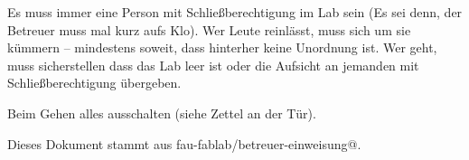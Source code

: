 \documentclass{\basedir/fablab-document}
\begin{document}
Es muss immer eine Person mit Schließberechtigung im Lab sein (Es sei denn, der Betreuer muss mal kurz aufs Klo). Wer Leute reinlässt, muss sich um sie kümmern -- mindestens soweit, dass hinterher keine Unordnung ist. Wer geht, muss sicherstellen dass das Lab leer ist oder die Aufsicht an jemanden mit Schließberechtigung übergeben.

Beim Gehen alles ausschalten (siehe Zettel an der Tür).



Dieses Dokument stammt aus fau-fablab/betreuer-einweisung@\Revision{}.
\end{document}
